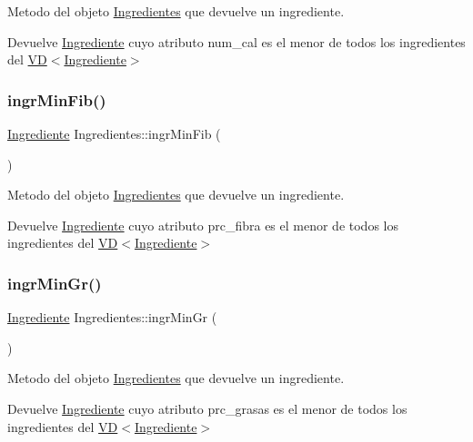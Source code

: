 Metodo del objeto \hyperlink{classIngredientes}{Ingredientes} que devuelve un ingrediente. 

\begin{DoxyReturn}{Devuelve}
\hyperlink{classIngrediente}{Ingrediente} cuyo atributo num\+\_\+cal es el menor de todos los ingredientes del \hyperlink{classVD}{V\+D$<$\+Ingrediente$>$} 
\end{DoxyReturn}
\mbox{\label{classIngredientes_a3ae4408bbffc06b34ef9aa969e4113b6}} 
\subsubsection{\texorpdfstring{ingr\+Min\+Fib()}{ingrMinFib()}}
{\footnotesize\ttfamily \hyperlink{classIngrediente}{Ingrediente} Ingredientes\+::ingr\+Min\+Fib (\begin{DoxyParamCaption}{ }\end{DoxyParamCaption})}



Metodo del objeto \hyperlink{classIngredientes}{Ingredientes} que devuelve un ingrediente. 

\begin{DoxyReturn}{Devuelve}
\hyperlink{classIngrediente}{Ingrediente} cuyo atributo prc\+\_\+fibra es el menor de todos los ingredientes del \hyperlink{classVD}{V\+D$<$\+Ingrediente$>$} 
\end{DoxyReturn}
\mbox{\label{classIngredientes_a17b17c5d77d5537911e49c234b280221}} 
\subsubsection{\texorpdfstring{ingr\+Min\+Gr()}{ingrMinGr()}}
{\footnotesize\ttfamily \hyperlink{classIngrediente}{Ingrediente} Ingredientes\+::ingr\+Min\+Gr (\begin{DoxyParamCaption}{ }\end{DoxyParamCaption})}



Metodo del objeto \hyperlink{classIngredientes}{Ingredientes} que devuelve un ingrediente. 

\begin{DoxyReturn}{Devuelve}
\hyperlink{classIngrediente}{Ingrediente} cuyo atributo prc\+\_\+grasas es el menor de todos los ingredientes del \hyperlink{classVD}{V\+D$<$\+Ingrediente$>$} 
\end{DoxyReturn}
\mbox{\label{classIngredientes_ae65cd2b1b7e0cc14487c3d9faf718344}} 
